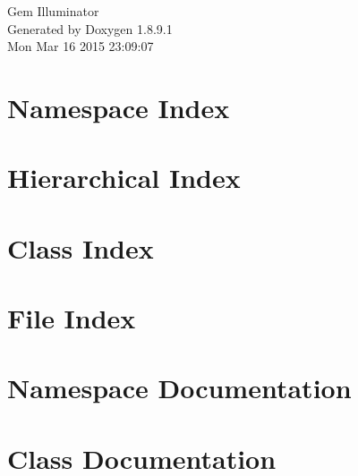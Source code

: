 \documentclass[twoside]{book}
\newcommand{\+}{\discretionary{\mbox{\scriptsize$\hookleftarrow$}}{}{}}
\newcommand{\clearemptydoublepage}{%
  \newpage{\pagestyle{empty}\cleardoublepage}%
}
\begin{document}
\hypersetup{pageanchor=false,
             bookmarks=true,
             bookmarksnumbered=true,
             pdfencoding=unicode
            }
\begin{titlepage}
\vspace*{7cm}
\begin{center}%
{\Large Gem Illuminator }\\
\vspace*{1cm}
{\large Generated by Doxygen 1.8.9.1}\\
\vspace*{0.5cm}
{\small Mon Mar 16 2015 23:09:07}\\
\end{center}
\end{titlepage}
\clearemptydoublepage
\tableofcontents
\clearemptydoublepage
{}
\hypersetup{pageanchor=true}

\chapter{Namespace Index}

\chapter{Hierarchical Index}

\chapter{Class Index}

\chapter{File Index}

\chapter{Namespace Documentation}





\chapter{Class Documentation}































\end{document}
